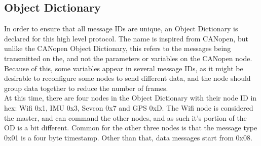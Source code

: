 \subsection{Object Dictionary}\label{sub:OD}
In order to ensure that all message IDs are unique, an Object Dictionary is declared for this high level protocol.
The name is inspired from CANopen, but unlike the CANopen Object Dictionary, this refers to the messages being transmitted on the, and not the parameters or variables on the CANopen node.
Because of this, some variables appear in several message IDs, as it might be desirable to reconfigure some nodes to send different data, and the node should group data together to reduce the number of frames.\\

At this time, there are four nodes in the Object Dictionary with their node ID in hex: Wifi 0x1, IMU 0x3, Sevcon 0x7 and GPS 0xD.
The Wifi node is considered the master, and can command the other nodes, and as such it's portion of the OD is a bit different. 
Common for the other three nodes is that the message type 0x01 is a four byte timestamp.
Other than that, data messages start from 0x08.\\

